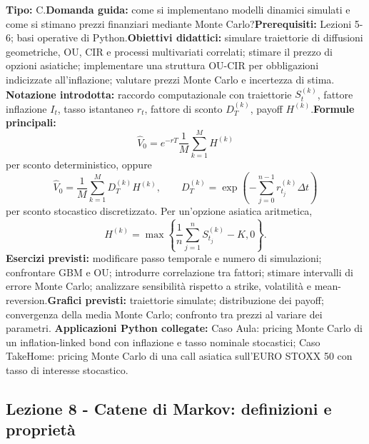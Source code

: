 \documentclass[12pt,a4paper]{article}%
\newcommand{\1}{\mathbf{1}}
\begin{document}
\textbf{Tipo:} C.\newline\textbf{Domanda guida:} come si implementano modelli
dinamici simulati e come si stimano prezzi finanziari mediante Monte
Carlo?\newline\textbf{Prerequisiti:} Lezioni 5-6; basi operative di
Python.\newline\textbf{Obiettivi didattici:} simulare traiettorie di diffusioni geometriche, OU,
CIR e processi multivariati correlati; stimare il prezzo di opzioni asiatiche;
implementare una struttura OU-CIR per obbligazioni indicizzate
all'inflazione; valutare prezzi Monte Carlo e incertezza di stima.\newline%
\textbf{Notazione introdotta:} raccordo computazionale con traiettorie
$S_{t}^{(k)}$, fattore inflazione $I_{t}$, tasso istantaneo $r_{t}$, fattore
di sconto $D_{T}^{(k)}$, payoff $H^{(k)}$.\newline\textbf{Formule
principali:}
\[
\widehat{V}_{0}=e^{-rT}\frac{1}{M}\sum_{k=1}^{M}H^{(k)}
\]
per sconto deterministico, oppure
\[
\widehat{V}_{0}=\frac{1}{M}\sum_{k=1}^{M}D_{T}^{(k)}H^{(k)}, \qquad
D_{T}^{(k)}=\exp\left( -\sum_{j=0}^{n-1}r_{t_{j}}^{(k)}\Delta t\right)
\]
per sconto stocastico discretizzato. Per un'opzione asiatica aritmetica,
\[
H^{(k)}=\max\left\{ \frac{1}{n}\sum_{j=1}^{n}S_{t_{j}}^{(k)}-K,0\right\} .
\]
\textbf{Esercizi previsti:} modificare passo temporale e numero di
simulazioni; confrontare GBM e OU; introdurre correlazione tra fattori;
stimare intervalli di errore Monte Carlo; analizzare sensibilit\`{a} rispetto
a strike, volatilit\`{a} e mean-reversion.\newline\textbf{Grafici previsti:}
traiettorie simulate; distribuzione dei payoff; convergenza della media Monte
Carlo; confronto tra prezzi al variare dei parametri.\newline%
\textbf{Applicazioni Python collegate:} Caso Aula: pricing Monte Carlo di un
inflation-linked bond con inflazione e tasso nominale stocastici; Caso
TakeHome: pricing Monte Carlo di una call asiatica sull'EURO STOXX 50 con
tasso di interesse stocastico.

\subsection{Lezione 8 - Catene di Markov: definizioni e propriet\`{a}}
\end{document}
